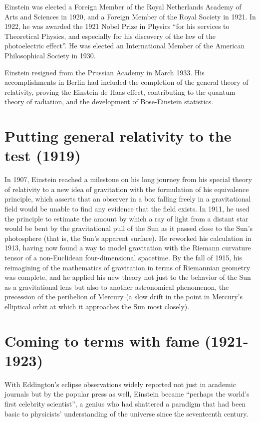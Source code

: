 \documentclass[twoside]{memoir}
\begin{document}
Einstein was elected a Foreign Member of the Royal Netherlands Academy of Arts and Sciences in 1920,\cite{3gcYy} and a Foreign Member of the Royal Society in 1921. In 1922, he was awarded the 1921 Nobel Prize in Physics \enquote{for his services to Theoretical Physics, and especially for his discovery of the law of the photoelectric effect}. He was elected an International Member of the American Philosophical Society in 1930.

Einstein resigned from the Prussian Academy in March 1933. His accomplishments in Berlin had included the completion of the general theory of relativity, proving the Einstein-de Haas effect, contributing to the quantum theory of radiation, and the development of Bose-Einstein statistics.
\chapter{Putting general relativity to the test (1919)}
In 1907, Einstein reached a milestone on his long journey from his special theory of relativity to a new idea of gravitation with the formulation of his equivalence principle, which asserts that an observer in a box falling freely in a gravitational field would be unable to find any evidence that the field exists. In 1911, he used the principle to estimate the amount by which a ray of light from a distant star would be bent by the gravitational pull of the Sun as it passed close to the Sun's photosphere (that is, the Sun's apparent surface). He reworked his calculation in 1913, having now found a way to model gravitation with the Riemann curvature tensor of a non-Euclidean four-dimensional spacetime. By the fall of 1915, his reimagining of the mathematics of gravitation in terms of Riemannian geometry was complete, and he applied his new theory not just to the behavior of the Sun as a gravitational lens but also to another astronomical phenomenon, the precession of the perihelion of Mercury (a slow drift in the point in Mercury's elliptical orbit at which it approaches the Sun most closely).
\chapter{Coming to terms with fame (1921-1923)}
With Eddington's eclipse observations widely reported not just in academic journals but by the popular press as well, Einstein became \enquote{perhaps the world's first celebrity scientist}, a genius who had shattered a paradigm that had been basic to physicists' understanding of the universe since the seventeenth century.
\end{document}
